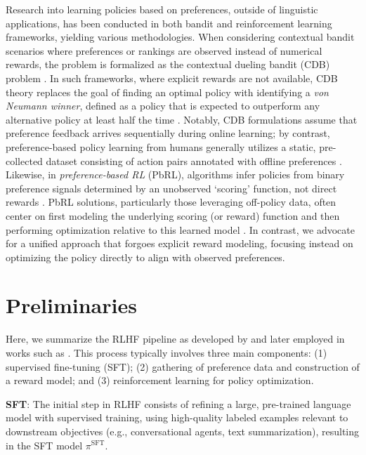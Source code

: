 Research into learning policies based on preferences, outside of linguistic applications, has been conducted in both bandit and reinforcement learning frameworks, yielding various methodologies. When considering contextual bandit scenarios where preferences or rankings are observed instead of numerical rewards, the problem is formalized as the contextual dueling bandit (CDB) problem \citep{yue2012karmed,dudik2015contextual}. In such frameworks, where explicit rewards are not available, CDB theory replaces the goal of finding an optimal policy with identifying a \textit{von Neumann winner}, defined as a policy that is expected to outperform any alternative policy at least half the time \citep{dudik2015contextual}. Notably, CDB formulations assume that preference feedback arrives sequentially during online learning; by contrast, preference-based policy learning from humans generally utilizes a static, pre-collected dataset consisting of action pairs annotated with offline preferences \citep{yan2022human}. Likewise, in \textit{preference-based RL} (PbRL), algorithms infer policies from binary preference signals determined by an unobserved ‘scoring’ function, not direct rewards \citep{BusaFekete2014,ruiz2023dueling}. PbRL solutions, particularly those leveraging off-policy data, often center on first modeling the underlying scoring (or reward) function and then performing optimization relative to this learned model \citep{jain2013learning,BusaFekete2014,christiano2017deep,sadigh2017active,kupcsik2018learning}. In contrast, we advocate for a unified approach that forgoes explicit reward modeling, focusing instead on optimizing the policy directly to align with observed preferences.

\section{Preliminaries}\label{section:prelims}

Here, we summarize the RLHF pipeline as developed by \citeauthor{ziegler2020finetuning} and later employed in works such as \citep{stiennon2022learning, bai2022training, ouyang2022training}. This process typically involves three main components: (1) supervised fine-tuning (SFT); (2) gathering of preference data and construction of a reward model; and (3) reinforcement learning for policy optimization.

\textbf{SFT}: The initial step in RLHF consists of refining a large, pre-trained language model with supervised training, using high-quality labeled examples relevant to downstream objectives (e.g., conversational agents, text summarization), resulting in the SFT model $\pi^\text{SFT}$.

